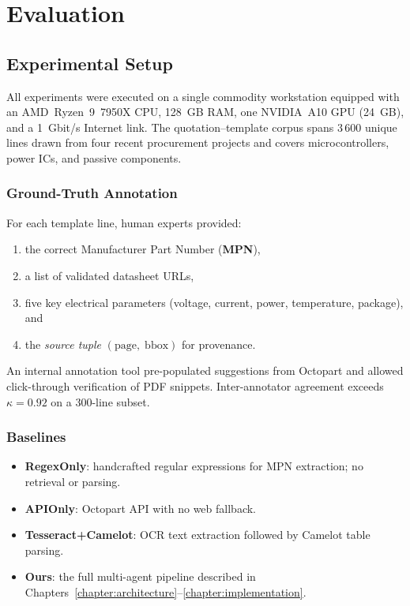 \chapter{Evaluation}
\label{chapter:evaluation}

\section{Experimental Setup}
All experiments were executed on a single commodity workstation equipped with an AMD~Ryzen~9~7950X CPU, 128~GB RAM, one NVIDIA~A10 GPU (24~GB), and a 1~Gbit/s Internet link.  The quotation–template corpus spans 3\,600 unique lines drawn from four recent procurement projects and covers microcontrollers, power ICs, and passive components.

\subsection{Ground-Truth Annotation}
For each template line, human experts provided:
\begin{enumerate}
  \item the correct Manufacturer Part Number (\textbf{MPN}),
  \item a list of validated datasheet URLs,
  \item five key electrical parameters (voltage, current, power, temperature, package), and
  \item the \emph{source tuple} $(\mathrm{page},\;\mathrm{bbox})$ for provenance.
\end{enumerate}
An internal annotation tool pre-populated suggestions from Octopart and allowed click-through verification of PDF snippets.  Inter-annotator agreement exceeds~$\kappa=0.92$ on a 300-line subset.

\subsection{Baselines}
\begin{itemize}
  \item \textbf{RegexOnly}: handcrafted regular expressions for MPN extraction; no retrieval or parsing.
  \item \textbf{APIOnly}: Octopart API with no web fallback.
  \item \textbf{Tesseract+Camelot}: OCR text extraction followed by Camelot table parsing.
  \item \textbf{Ours}: the full multi-agent pipeline described in Chapters~\ref{chapter:architecture}–\ref{chapter:implementation}.
\end{itemize}

